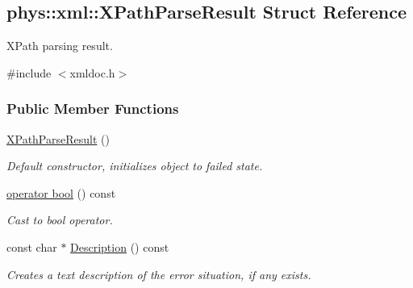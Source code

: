 \hypertarget{structphys_1_1xml_1_1XPathParseResult}{
\subsection{phys::xml::XPathParseResult Struct Reference}
\label{d8/d54/structphys_1_1xml_1_1XPathParseResult}
}


XPath parsing result.  




{\ttfamily \#include $<$xmldoc.h$>$}

\subsubsection*{Public Member Functions}
\begin{DoxyCompactItemize}
\item 
\hypertarget{structphys_1_1xml_1_1XPathParseResult_ac41f4db5604d32679933be58bc74aa23}{
\hyperlink{structphys_1_1xml_1_1XPathParseResult_ac41f4db5604d32679933be58bc74aa23}{XPathParseResult} ()}
\label{d8/d54/structphys_1_1xml_1_1XPathParseResult_ac41f4db5604d32679933be58bc74aa23}

\begin{DoxyCompactList}\small\item\em Default constructor, initializes object to failed state. \item\end{DoxyCompactList}\item 
\hyperlink{structphys_1_1xml_1_1XPathParseResult_a8dddf12100a6c40f9abcd8c0b7b37816}{operator bool} () const 
\begin{DoxyCompactList}\small\item\em Cast to bool operator. \item\end{DoxyCompactList}\item 
const char $\ast$ \hyperlink{structphys_1_1xml_1_1XPathParseResult_a458f459d8a537b5eec424d6a1c463541}{Description} () const 
\begin{DoxyCompactList}\small\item\em Creates a text description of the error situation, if any exists. \item\end{DoxyCompactList}\end{DoxyCompactItemize}
